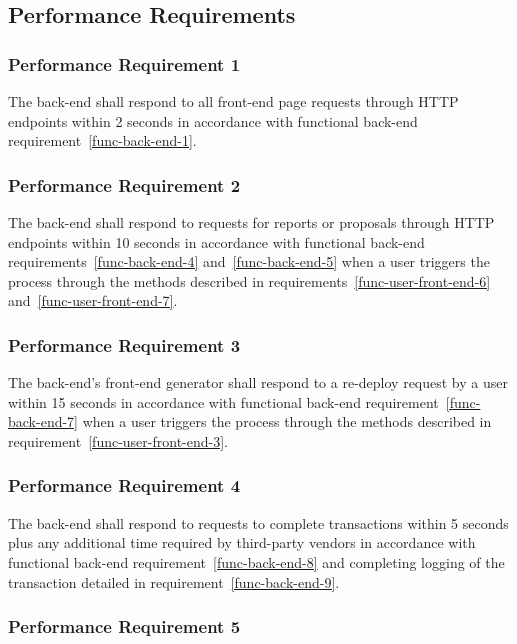 \documentclass{article}
\begin{document}
\pagebreak
\subsection{Performance Requirements}

\subsubsection{Performance Requirement 1}
\label{perf-back-end-1}

The back-end shall respond to all front-end page requests through HTTP endpoints
within 2 seconds in accordance with functional back-end
requirement~\ref{func-back-end-1}.

\subsubsection{Performance Requirement 2}
\label{perf-back-end-2}

The back-end shall respond to requests for reports or proposals through HTTP
endpoints within 10 seconds in accordance with functional back-end
requirements~\ref{func-back-end-4} and~\ref{func-back-end-5} when a user
triggers the process through the methods described in
requirements~\ref{func-user-front-end-6} and~\ref{func-user-front-end-7}.

\subsubsection{Performance Requirement 3}
\label{perf-back-end-3}

The back-end's front-end generator shall respond to a re-deploy request by a
user within 15 seconds in accordance with functional back-end
requirement~\ref{func-back-end-7} when a user triggers the process through the
methods described in requirement~\ref{func-user-front-end-3}.

\subsubsection{Performance Requirement 4}
\label{perf-back-end-4}

The back-end shall respond to requests to complete transactions within 5 seconds
plus any additional time required by third-party vendors in accordance with
functional back-end requirement~\ref{func-back-end-8} and completing logging of
the transaction detailed in requirement~\ref{func-back-end-9}.

\subsubsection{Performance Requirement 5}
\label{perf-back-end-5}
\end{document}
